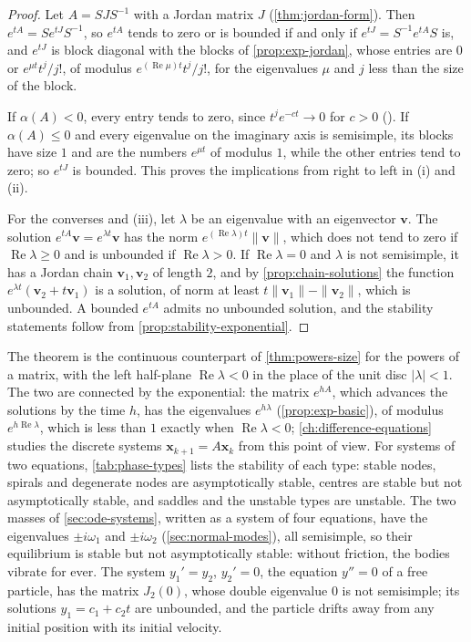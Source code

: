 \begin{proof}
Let $A=SJS^{-1}$ with a Jordan matrix $J$ (\cref{thm:jordan-form}). Then $e^{tA}=Se^{tJ}S^{-1}$, so $e^{tA}$ tends to zero or is bounded if and only if $e^{tJ}=S^{-1}e^{tA}S$ is, and $e^{tJ}$ is block diagonal with the blocks of \cref{prop:exp-jordan}, whose entries are $0$ or $e^{\mu t}t^j/j!$, of modulus $e^{(\operatorname{Re}\mu)t}t^j/j!$, for the eigenvalues $\mu$ and $j$ less than the size of the block.

If $\alpha(A)<0$, every entry tends to zero, since $t^je^{-ct}\to0$ for $c>0$ (). If $\alpha(A)\le0$ and every eigenvalue on the imaginary axis is semisimple, its blocks have size $1$ and are the numbers $e^{\mu t}$ of modulus $1$, while the other entries tend to zero; so $e^{tJ}$ is bounded. This proves the implications from right to left in (i) and (ii).

For the converses and (iii), let $\lambda$ be an eigenvalue with an eigenvector $\mathbf v$. The solution $e^{tA}\mathbf v=e^{\lambda t}\mathbf v$ has the norm $e^{(\operatorname{Re}\lambda)t}\|\mathbf v\|$, which does not tend to zero if $\operatorname{Re}\lambda\ge0$ and is unbounded if $\operatorname{Re}\lambda>0$. If $\operatorname{Re}\lambda=0$ and $\lambda$ is not semisimple, it has a Jordan chain $\mathbf v_1,\mathbf v_2$ of length $2$, and by \cref{prop:chain-solutions} the function $e^{\lambda t}(\mathbf v_2+t\mathbf v_1)$ is a solution, of norm at least $t\|\mathbf v_1\|-\|\mathbf v_2\|$, which is unbounded. A bounded $e^{tA}$ admits no unbounded solution, and the stability statements follow from \cref{prop:stability-exponential}.
\end{proof}

The theorem is the continuous counterpart of \cref{thm:powers-size} for the powers of a matrix, with the left half-plane $\operatorname{Re}\lambda<0$ in the place of the unit disc $|\lambda|<1$. The two are connected by the exponential: the matrix $e^{hA}$, which advances the solutions by the time $h$, has the eigenvalues $e^{h\lambda}$ (\cref{prop:exp-basic}), of modulus $e^{h\operatorname{Re}\lambda}$, which is less than $1$ exactly when $\operatorname{Re}\lambda<0$; \cref{ch:difference-equations} studies the discrete systems $\mathbf x_{k+1}=A\mathbf x_k$ from this point of view. For systems of two equations, \cref{tab:phase-types} lists the stability of each type: stable nodes, spirals and degenerate nodes are asymptotically stable, centres are stable but not asymptotically stable, and saddles and the unstable types are unstable. The two masses of \cref{sec:ode-systems}, written as a system of four equations, have the eigenvalues $\pm i\omega_1$ and $\pm i\omega_2$ (\cref{sec:normal-modes}), all semisimple, so their equilibrium is stable but not asymptotically stable: without friction, the bodies vibrate for ever. The system $y_1'=y_2$, $y_2'=0$, the equation $y''=0$ of a free particle, has the matrix $J_2(0)$, whose double eigenvalue $0$ is not semisimple; its solutions $y_1=c_1+c_2t$ are unbounded, and the particle drifts away from any initial position with its initial velocity.

